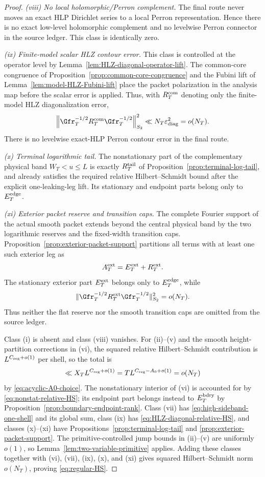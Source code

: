 \begin{proof}
\emph{(viii) No local holomorphic/Perron complement.}
The final route never moves an exact HLP Dirichlet series to a local Perron
representation.  Hence there is no exact low-level holomorphic complement and
no levelwise Perron connector in the source ledger.  This class is identically
zero.

\emph{(ix) Finite-model scalar HLZ contour error.}
This class is controlled at the operator level by
Lemma~\ref{lem:HLZ-diagonal-operator-lift}.  The common-core congruence of
Proposition~\ref{prop:common-core-congruence} and the Fubini lift of
Lemma~\ref{lem:model-HLZ-Fubini-lift} place the packet polarization in the
analysis map before the scalar error is applied. Thus, with $R_T^{\rm com}$
denoting only the finite-model HLZ diagonalization error,
\[
\left\|\Gfr_T^{-1/2}R_T^{\rm com}\Gfr_T^{-1/2}\right\|_{S_2}^2
\ll N_T\varepsilon_{\rm diag}^2=o(N_T).
\]
There is no levelwise exact-HLP Perron contour error in the final route.

\emph{(x) Terminal logarithmic tail.}
The nonstationary part of the complementary physical band $W_T<u\le L$ is
exactly $R_T^{\rm tail}$ of Proposition~\ref{prop:terminal-log-tail}, and
already satisfies the required relative Hilbert--Schmidt bound after the
explicit one-leaking-leg lift. Its stationary and endpoint parts belong only
to $E_T^{\rm edge}$.

\emph{(xi) Exterior packet reserve and transition caps.}
The complete Fourier support of the actual smooth packet extends beyond the
central physical band by the two logarithmic reserves and the fixed-width
transition caps. Proposition~\ref{prop:exterior-packet-support} partitions all
terms with at least one such exterior leg as
\[
A_T^{\rm ext}=E_T^{\rm ext}+R_T^{\rm ext}.
\]
The stationary exterior part $E_T^{\rm ext}$ belongs only to
$E_T^{\rm edge}$, while
\[
\|\Gfr_T^{-1/2}R_T^{\rm ext}\Gfr_T^{-1/2}\|_{S_2}^2=o(N_T).
\]
Thus neither the flat reserve nor the smooth transition caps are omitted from
the source ledger.

Class (i) is absent and class (viii) vanishes. For (ii)--(v) and the smooth
height-partition corrections in (vi), the squared relative Hilbert--Schmidt
contribution is $L^{C_{\rm reg}+o(1)}$ per shell, so the total is
\[
\ll X_TL^{C_{\rm reg}+o(1)}
=T L^{C_{\rm reg}-A_0+o(1)}=o(N_T)
\]
by \eqref{eq:acyclic-A0-choice}. The nonstationary interior of (vi) is accounted
for by \eqref{eq:nonstat-relative-HS}; its endpoint part belongs instead to
$E_T^{\rm bdry}$ by Proposition~\ref{prop:boundary-endpoint-rank}. Class (vii)
has \eqref{eq:high-sideband-one-shell} and its global sum, class (ix) has
\eqref{eq:HLZ-diagonal-relative-HS}, and classes (x)--(xi) have
Propositions~\ref{prop:terminal-log-tail} and
\ref{prop:exterior-packet-support}. The primitive-controlled jump bounds in
(ii)--(v) are uniformly $o(1)$, so Lemma~\ref{lem:two-variable-primitive}
applies. Adding these classes together with (vi), (vii), (ix), (x), and (xi)
gives squared Hilbert--Schmidt norm $o(N_T)$, proving
\eqref{eq:regular-HS}.
\end{proof}

